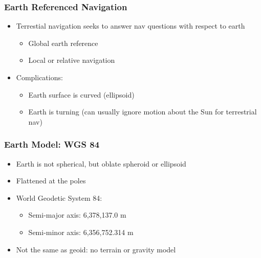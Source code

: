 \begin{frame}
\frametitle{Earth Referenced Navigation}
 \begin{itemize}
 \item Terrestial navigation seeks to answer nav questions with respect to earth
 \begin{itemize}
   \item Global earth reference
   \item Local or relative navigation
 \end{itemize}
 \item Complications:
 \begin{itemize}
   \item Earth surface is curved (ellipsoid)
   \item Earth is turning (can usually ignore motion about the Sun for terrestrial nav)
 \end{itemize}
\end{itemize}
\end{frame}

\begin{frame}
\frametitle{Earth Model:  WGS 84}
\begin{itemize}
  \item Earth is not spherical, but oblate spheroid or ellipsoid
  \item Flattened at the poles
  \item World Geodetic System 84:
  \begin{itemize}
   \item Semi-major axis:  6,378,137.0 m
        \item Semi-minor axis:  6,356,752.314  m
  \end{itemize}
  \item Not the same as geoid:  no terrain or gravity model
\end{itemize} 
\end{frame}
